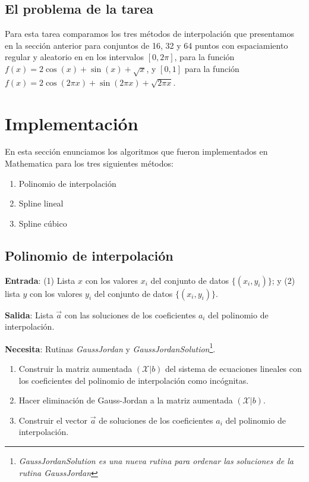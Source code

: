 \documentclass[11pt,letterpaper]{article}
\begin{document}
\subsection{El problema de la tarea}
Para esta tarea comparamos los tres métodos 
de interpolación que presentamos en la sección anterior para conjuntos de 
16, 32 y 64 puntos con espaciamiento regular y aleatorio en en los intervalos
$[0,2\pi]$, para la función $f(x)=2\cos (x)+\sin (x)+\sqrt{x}$, y
$[0,1]$ para la función $f(x)=2\cos (2\pi x)+\sin (2\pi x)+\sqrt{2\pi x}$.

\section{Implementación}
En esta sección enunciamos los algoritmos que fueron implementados en 
Mathematica para los tres siguientes métodos:
\begin{enumerate}
\item Polinomio de interpolación
\item Spline lineal
\item Spline cúbico 
\end{enumerate}

\subsection{Polinomio de interpolación}
\textbf{Entrada}: (1) Lista $x$ con los valores $x_i$ del conjunto de datos $\{(x_i,y_i)\}$;
y (2) lista $y$ con los valores $y_i$ del conjunto de datos $\{(x_i,y_i)\}$.

\textbf{Salida}: Lista $\vec a$ con las soluciones de los coeficientes $a_i$ del polinomio 
de interpolación.

\textbf{Necesita}: Rutinas \textit{GaussJordan} y \textit{GaussJordanSolution}\footnote{
\textit{GaussJordanSolution es una nueva rutina para ordenar las soluciones
de la rutina \textit{GaussJordan}} %
}.
\begin{enumerate}
\item Construir la matriz aumentada $(\mathcal{X}|b)$ del sistema 
de ecuaciones lineales con los coeficientes del polinomio de interpolación
como incógnitas.
\item Hacer eliminación de Gauss-Jordan a la matriz aumentada $(\mathcal{X}|b)$.
\item Construir el vector $\vec a$ de soluciones de los coeficientes $a_i$
del polinomio de interpolación.
\end{enumerate}
\end{document}
